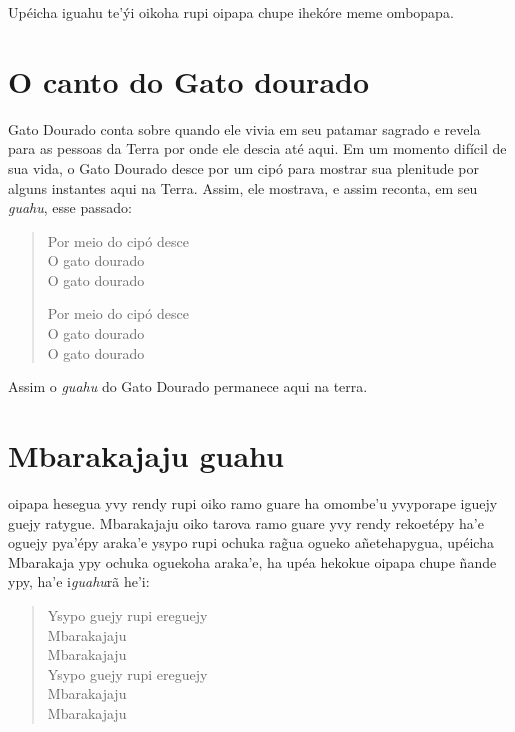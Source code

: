 Upéicha iguahu te'ýi oikoha rupi oipapa chupe ihekóre meme ombopapa.


\chapter{O canto do Gato dourado}

 Gato Dourado conta sobre quando ele vivia em seu patamar sagrado e
revela para as pessoas da Terra por onde ele descia até aqui. Em um
momento difícil de sua vida, o Gato Dourado desce por um cipó para
mostrar sua plenitude por alguns instantes aqui na Terra. Assim, ele
mostrava, e assim reconta, em seu \textit{guahu}, esse passado:

\begin{verse}
Por meio do cipó desce\\
O gato dourado\footnotemark{}\\
O gato dourado

Por meio do cipó desce\\
O gato dourado\\
O gato dourado
\end{verse}

Assim o \textit{guahu} do Gato Dourado permanece aqui na terra.


\chapter{Mbarakajaju guahu}

 oipapa hesegua yvy rendy rupi oiko ramo guare ha omombe'u
yvyporape iguejy guejy ratygue. Mbarakajaju oiko tarova ramo guare yvy
rendy rekoetépy ha'e oguejy pya'épy araka'e ysypo rupi ochuka rag̃ua
ogueko añetehapygua, upéicha Mbarakaja ypy ochuka oguekoha araka'e, ha
upéa hekokue oipapa chupe ñande ypy, ha'e i\textit{guahu}rã he'i:


\begin{verse}
Ysypo guejy rupi ereguejy\\
Mbarakajaju\\
Mbarakajaju\\

Ysypo guejy rupi ereguejy\\
Mbarakajaju\\
Mbarakajaju
\end{verse}


